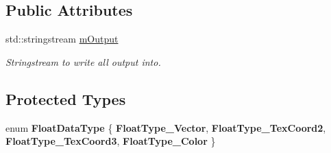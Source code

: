 \subsection*{Public Attributes}
\begin{DoxyCompactItemize}
\item 
\hypertarget{class_assimp_1_1_collada_exporter_ab77fa1868d12fdb3b8adc4391c5c0306}{std\+::stringstream \hyperlink{class_assimp_1_1_collada_exporter_ab77fa1868d12fdb3b8adc4391c5c0306}{m\+Output}}\label{class_assimp_1_1_collada_exporter_ab77fa1868d12fdb3b8adc4391c5c0306}

\begin{DoxyCompactList}\small\item\em Stringstream to write all output into. \end{DoxyCompactList}\end{DoxyCompactItemize}
\subsection*{Protected Types}
\begin{DoxyCompactItemize}
\item 
\hypertarget{class_assimp_1_1_collada_exporter_a7f71b9d8ea4459b4c10298d220f546d6}{enum {\bfseries Float\+Data\+Type} \{ {\bfseries Float\+Type\+\_\+\+Vector}, 
{\bfseries Float\+Type\+\_\+\+Tex\+Coord2}, 
{\bfseries Float\+Type\+\_\+\+Tex\+Coord3}, 
{\bfseries Float\+Type\+\_\+\+Color}
 \}}\label{class_assimp_1_1_collada_exporter_a7f71b9d8ea4459b4c10298d220f546d6}

\end{DoxyCompactItemize}
